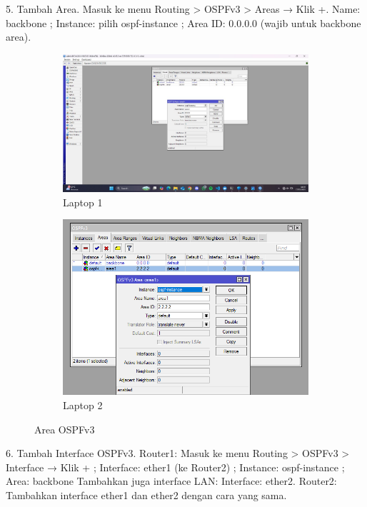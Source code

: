5. Tambah Area. Masuk ke menu Routing > OSPFv3 > Areas → Klik +. Name: backbone ; Instance: pilih ospf-instance ; Area ID: 0.0.0.0 (wajib untuk backbone area).
\begin{figure}[H]
    \centering
    \begin{subfigure}[b]{0.3\linewidth}
      \centering
      \includegraphics[width=\linewidth]{image/dinamis4.jpg}
      \caption{Laptop 1}
    \end{subfigure}
    \hspace{1cm}
    \begin{subfigure}[b]{0.3\linewidth}
      \centering
      \includegraphics[width=\linewidth]{image/dinamis3.png}
      \caption{Laptop 2}
    \end{subfigure}
    \caption{Area OSPFv3}
\end{figure}
6. Tambah Interface OSPFv3. Router1: Masuk ke menu Routing > OSPFv3 > Interface → Klik + ; Interface: ether1 (ke Router2) ; Instance: ospf-instance ; Area: backbone Tambahkan juga interface LAN: Interface: ether2. Router2: Tambahkan interface ether1 dan ether2 dengan cara yang sama.

